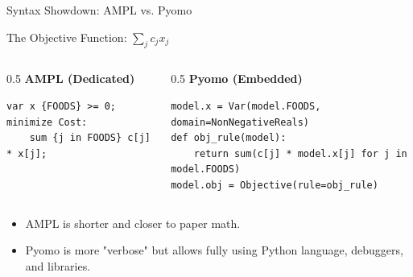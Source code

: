 \documentclass[presentation, aspectratio=169]{beamer}
\begin{document}
\begin{frame}[label={sec:orgcaf948b},fragile]{Syntax Showdown: AMPL vs. Pyomo}
\begin{block}{The Objective Function: \(\sum_{j} c_j x_j\)}
\scriptsize
\begin{columns}
\begin{column}{0.5\textwidth}
\textbf{AMPL (Dedicated)}
\begin{verbatim}
var x {FOODS} >= 0;
minimize Cost: 
    sum {j in FOODS} c[j] * x[j];
\end{verbatim}
\end{column}
\begin{column}{0.5\textwidth}
\textbf{Pyomo (Embedded)}
\begin{verbatim}
model.x = Var(model.FOODS, domain=NonNegativeReals)
def obj_rule(model):
    return sum(c[j] * model.x[j] for j in model.FOODS)
model.obj = Objective(rule=obj_rule)
\end{verbatim}
\end{column}
\end{columns}
\end{block}

\begin{block}{}
\begin{itemize}
\item \alert{\alert{AMPL}} is shorter and closer to paper math.
\item \alert{\alert{Pyomo}} is more "verbose" but allows fully using Python language, debuggers, and libraries.
\end{itemize}
\end{block}
\end{frame}
\end{document}
